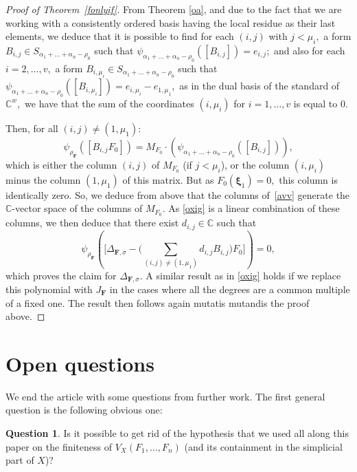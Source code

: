 \documentclass[a4paper,11pt]{amsart}
\newcommand{\C}{\mathbb{C}}
\newcommand{\bfF}{{\boldsymbol{F}}}
\newcommand{\bfxi}{{\boldsymbol{\xi}}}
\newcounter{thm}
\numberwithin{thm}{section}
\numberwithin{equation}{section}
\theoremstyle{definition}
\newtheorem{question}[thm]{Question}
\theoremstyle{plain}
\begin{document}
\begin{proof}[Proof of Theorem~\ref{fonlyif}]
From Theorem \ref{oa}, and due to the fact that we are working with a consistently ordered basis 
having the local residue as their last elements,  we deduce that it is possible to find  for each $(i,j)$ with $j<\mu_i,$  a form  $B_{i,j}\in S_{\alpha_1+\ldots+\alpha_n-\rho_0}$ such that
$\psi_{\alpha_1+\ldots+\alpha_n-\rho_0}([B_{i,j}])=e_{i,j};$ and also for each $i=2,\ldots, v,$ a form  
$B_{i,\mu_i}\in S_{\alpha_1+\ldots+\alpha_n-\rho_0}$ such that
$\psi_{\alpha_1+\ldots+\alpha_n-\rho_0}([B_{i,\mu_i}])=e_{i,\mu_i}-e_{1,\mu_1},$ as in the dual basis of the standard of $\C^w,$ we have that the sum of the coordinates $(i, \mu_i)$ for $i=1, \dots,v$ is equal to $0$.

Then, for all $(i,j)\neq(1,\mu_1)$:
\begin{equation}\label{avv}
\psi_{\rho_\bfF}([B_{i,j}F_0])=M_{F_0}\cdot \left(\psi_{\alpha_1+\ldots+\alpha_n-\rho_0}([B_{i,j}])\right),
\end{equation}
which is either the column $(i,j)$ of $M_{F_0}$ (if $j<\mu_i$), or the column $(i,\mu_i)$ minus the column $(1,\mu_1)$ of this matrix. 
But  as $F_0(\bfxi_1)=0,$ this  column is identically zero. So, we deduce from above that the columns 
of~\eqref{avv} generate the $\C$-vector space of the columns of $M_{F_0}.$
As \eqref{oxig} is a linear combination of these columns, we then deduce that there exist $d_{i,j}\in\C$ such that
$$\psi_{\rho_\bfF}\left(\Big[\Delta_{\bfF,\sigma}-\Big(\sum_{(i,j)\neq(1,\mu_1)} d_{i,j}B_{i,j}\Big)F_0\Big]\right)=0,
$$
which proves the claim for $\Delta_{\bfF,\sigma}.$ A similar result as in \eqref{oxig} holds if we replace this polynomial with 
$J_{\bfF}$ in the cases where all the degrees are a common multiple of a fixed one. The result then follows again mutatis mutandis the proof above.
\end{proof}

\bigskip
\section{Open questions}\label{sec:open}

We end the article with some questions from further work. 
The first general question is the following obvious one:
\begin{question}\label{q:one}
Is it possible to get rid of the hypothesis that we used all along this paper on the finiteness of $V_X(F_1,\ldots, F_n)$ (and its containment in the simplicial part of $X$)?
\end{question}
\end{document}
